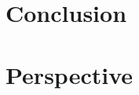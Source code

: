 
\chapter*{Conclusion}\label{section:generalconclusion}
\chapter*{Perspective}\label{section:perspectives}
